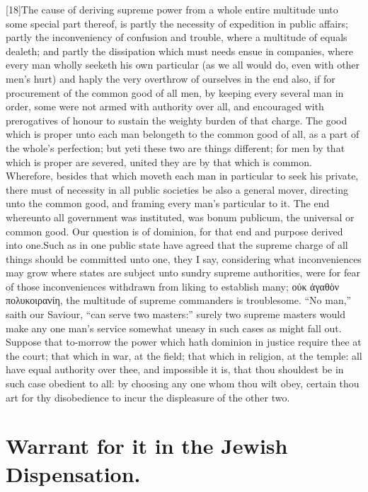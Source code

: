 [18]The cause of deriving supreme power from a whole entire multitude unto some special part thereof, is partly the necessity of expedition in public affairs; partly the inconveniency of confusion and trouble, where a multitude of equals dealeth; and partly the dissipation which must needs ensue in companies, where every man wholly seeketh his own particular (as we all would do, even with other men’s hurt) and haply the very overthrow of ourselves in the end also, if for procurement of the common good of all men, by keeping every several man in order, some were not armed with authority over all, and encouraged with prerogatives of honour to sustain the weighty burden of that charge. The good which is proper unto each man belongeth to the common good of all, as a part of the whole’s perfection; but yeti these two  are things different; for men by that which is proper are severed, united they are by that which is common. Wherefore, besides that which moveth each man in particular to seek his private, there must of necessity in all public societies be also a general mover, directing unto the common good, and framing every man’s particular to it. The end whereunto all government was instituted, was bonum publicum, the universal or common good. Our question is of dominion, for that end and purpose derived into one.Such as in one public state have agreed that the supreme charge of all things should be committed unto one, they I say, considering what inconveniences may grow where states are subject unto sundry supreme authorities, were for fear of those inconveniences withdrawn from liking to establish many; οὐκ ἀγαθὸν πολυκοιρανίη, the multitude of supreme commanders is troublesome. “No man,” saith our Saviour, “can serve two masters:” surely two supreme masters would make any one man’s service somewhat uneasy in such cases as might fall out. Suppose that to-morrow the power which hath dominion in justice require thee at the court; that which in war, at the field; that which in religion, at the temple: all have equal authority over thee, and impossible it is, that thou shouldest be in such case obedient to all: by choosing any one whom thou wilt obey, certain thou art for thy disobedience to incur the displeasure of the other two.


\section*{Warrant for it in the Jewish Dispensation.}

